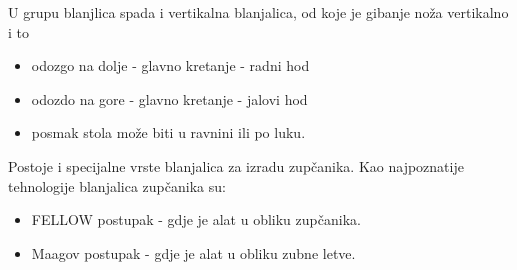 \documentclass[a4paper,12pt]{article}
\numberwithin{figure}{section}
\begin{document}
U grupu blanjlica spada i vertikalna blanjalica, od koje je gibanje noža vertikalno i to
\begin{itemize}
\item odozgo na dolje - glavno kretanje - radni hod
\item odozdo na gore - glavno kretanje - jalovi hod
\item posmak stola može biti u ravnini ili po luku.
\end{itemize}
Postoje i specijalne vrste blanjalica za izradu zupčanika. Kao najpoznatije tehnologije blanjalica zupčanika su:
\begin{itemize}
\item FELLOW postupak - gdje je alat u obliku zupčanika.
\item Maagov postupak - gdje je alat u obliku zubne letve.
\end{itemize}
\end{document}
